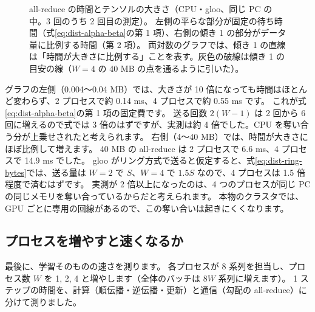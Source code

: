 \begin{figure}[tbp]
\centering
{}
\caption{all-reduce の時間とテンソルの大きさ（CPU・gloo、同じ PC の中。3 回のうち 2 回目の測定）。
左側の平らな部分が固定の待ち時間（式\eqref{eq:dist-alpha-beta}の第 1 項）、右側の傾き 1 の部分がデータ量に比例する時間（第 2 項）。
両対数のグラフでは、傾き 1 の直線は「時間が大きさに比例する」ことを表す。灰色の破線は傾き 1 の目安の線（$W=4$ の 40 MB の点を通るように引いた）。}
\label{fig:dist-allreduce}
\end{figure}

グラフの左側（0.004〜0.04 MB）では、大きさが 10 倍になっても時間はほとんど変わらず、2 プロセスで約 0.14 ms、4 プロセスで約 0.55 ms です。
これが式\eqref{eq:dist-alpha-beta}の第 1 項の固定費です。
送る回数 $2(W-1)$ は 2 回から 6 回に増えるので式では 3 倍のはずですが、実測は約 4 倍でした。CPU を奪い合う分が上乗せされたと考えられます。
右側（4〜40 MB）では、時間が大きさにほぼ比例して増えます。
40 MB の all-reduce は 2 プロセスで 6.6 ms、4 プロセスで 14.9 ms でした。
gloo がリング方式で送ると仮定すると、式\eqref{eq:dist-ring-bytes}では、送る量は $W=2$ で $S$、$W=4$ で $1.5S$ なので、4 プロセスは 1.5 倍程度で済むはずです。
実測が 2 倍以上になったのは、4 つのプロセスが同じ PC の同じメモリを奪い合っているからだと考えられます。
本物のクラスタでは、GPU ごとに専用の回線があるので、この奪い合いは起きにくくなります。

\subsection*{プロセスを増やすと速くなるか}

最後に、学習そのものの速さを測ります。
各プロセスが 8 系列を担当し、プロセス数 $W$ を 1, 2, 4 と増やします（全体のバッチは $8W$ 系列に増えます）。
1 ステップの時間を、計算（順伝播・逆伝播・更新）と通信（勾配の all-reduce）に分けて測りました。

